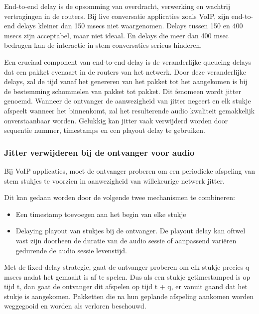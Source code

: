 
End-to-end delay is de opsomming van overdracht, verwerking en wachtrij vertragingen in de routers. Bij live conversatie applicaties zoals VoIP, zijn end-to-end delays kleiner dan 150 msecs niet waargenomen. Delays tussen 150 en 400 msecs zijn acceptabel, maar niet ideaal. En delays die meer dan 400 msec bedragen kan de interactie in stem conversaties serieus hinderen.




Een cruciaal component van end-to-end delay is de veranderlijke queueing delays dat een pakket evenaart in de routers van het netwerk. Door deze veranderlijke delays, zal de tijd vanaf het genereren van het pakket tot het aangekomen is bij de bestemming schommelen van pakket tot pakket. Dit fenomeen wordt jitter genoemd. Wanneer de ontvanger de aanwezigheid van jitter negeert en elk stukje afspeelt wanneer het binnenkomt, zal het resulterende audio kwaliteit gemakkelijk onverstaanbaar worden. Gelukkig kan jitter vaak verwijderd worden door sequentie nummer, timestamps en een playout delay te gebruiken.

\subsubsection{Jitter verwijderen bij de ontvanger voor audio}

\noindent Bij VoIP applicaties, moet de ontvanger proberen om een periodieke afspeling van stem stukjes te voorzien in aanwezigheid van willekeurige netwerk jitter. 

\noindent Dit kan gedaan worden door de volgende twee mechanismen te combineren:
\begin{itemize}
\item Een timestamp toevoegen aan het begin van elke stukje
\item Delaying playout van stukjes bij de ontvanger. De playout delay kan oftwel vast zijn doorheen de duratie van de audio sessie of aanpassend variëren gedurende de audio sessie levenstijd.
\end{itemize}


\noindent Met de fixed-delay strategie, gaat de ontvanger proberen om elk stukje precies q msecs nadat het gemaakt is af te spelen. Dus als een stukje getimestamped is op tijd t, dan gaat de ontvanger dit afspelen op tijd t + q, er vanuit gaand dat het stukje is aangekomen. Pakketten die na hun geplande afspeling aankomen worden weggegooid en worden als verloren beschouwd.

